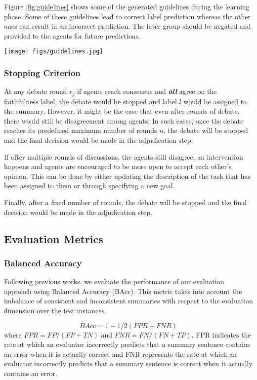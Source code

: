 Figure \ref{fig:guidelines} shows some of the generated guidelines during the learning phase. Some of these guidelines lead to correct label prediction whereas the other ones can result in an incorrect prediction. The later group should be negated and provided to the agents for future predictions.
\begin{figure*}
    \centering
    \texttt{[image: figs/guidelines.jpg]}
    \caption{Guidelines generated during learning phase.}
    \label{fig:guidelines}
\end{figure*}

\subsubsection{Stopping Criterion}\label{app:stop}
At any debate round $r_j$ if agents reach consensus and \textbf{\textit{all}} agree on the faithfulness label, the debate would be stopped and label $l$ would be assigned to the summary. 
However, it might be the case that even after rounds of debate, there would still be disagreement among agents. In such cases, once the debate reaches its predefined maximum number of rounds $n$, the debate will be stopped and the final decision would be made in the adjudication step.

If after multiple rounds of discussions, the agents still disagree, an intervention happens and agents are encouraged to be more open to accept each other’s opinion. This can be done by either updating the description of the task that has been assigned to them or through specifying a new goal.

Finally, after a fixed number of rounds, the debate will be stopped and the final decision would be made in the adjudication step.


\subsection{Evaluation Metrics}\label{app:metrics}
\subsubsection{Balanced Accuracy}
Following previous works, we evaluate the performance of our evaluation approach using Balanced Accuracy (BAcc). This metric takes into account the imbalance of consistent and inconsistent summaries with respect to the evaluation dimension over the test instances. 

\[ BAcc = 1 - 1/2(FPR+FNR)\]
where  $FPR=FP/(FP+TN)$ and $FNR=FN/(FN+TP)$.
FPR indicates the rate at which an evaluator incorrectly predicts that a summary sentence contains an error when it is actually correct and FNR represents the rate at which an evaluator incorrectly predicts that a summary sentence is correct when it actually contains an error.

